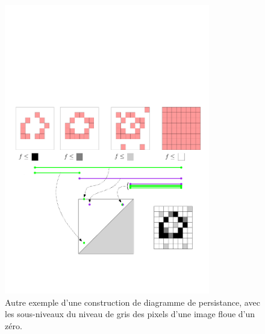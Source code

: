 

\begin{figure}[h]\centering
\includegraphics[width=0.8\textwidth]{figures/ExamplePersistence2}
\caption[Diagramme de persistance d'une image]{\label{fig:zeroflou} 
Autre exemple d'une construction de diagramme de persistance,
avec les sous-niveaux du niveau de gris des pixels d'une image floue d'un z\'ero.}
\end{figure}

